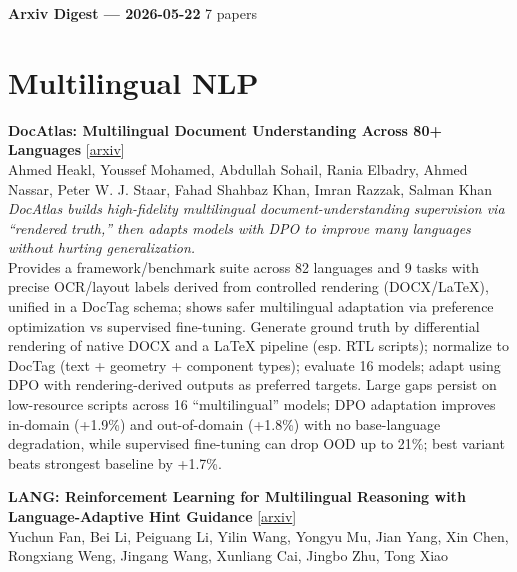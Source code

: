 \documentclass[12pt,letterpaper]{article}
\begin{document}
{\footnotesize\textbf{Arxiv Digest --- 2026-05-22} \hfill 7 papers}

\smallskip

\section*{Multilingual NLP}

{\small\textbf{DocAtlas: Multilingual Document Understanding Across 80+ Languages}} {\scriptsize[\href{https://arxiv.org/abs/2605.12623}{arxiv}]}\\
{\scriptsize Ahmed Heakl, Youssef Mohamed, Abdullah Sohail, Rania Elbadry, Ahmed Nassar, Peter W. J. Staar, Fahad Shahbaz Khan, Imran Razzak, Salman Khan}\\

{\small\textit{DocAtlas builds high-fidelity multilingual document-understanding supervision via ``rendered truth,'' then adapts models with DPO to improve many languages without hurting generalization.}}\\[1pt]
{\footnotesize Provides a framework/benchmark suite across 82 languages and 9 tasks with precise OCR/layout labels derived from controlled rendering (DOCX/LaTeX), unified in a DocTag schema; shows safer multilingual adaptation via preference optimization vs supervised fine-tuning. Generate ground truth by differential rendering of native DOCX and a LaTeX pipeline (esp. RTL scripts); normalize to DocTag (text + geometry + component types); evaluate 16 models; adapt using DPO with rendering-derived outputs as preferred targets. Large gaps persist on low-resource scripts across 16 ``multilingual'' models; DPO adaptation improves in-domain (+1.9\%) and out-of-domain (+1.8\%) with no base-language degradation, while supervised fine-tuning can drop OOD up to 21\%; best variant beats strongest baseline by +1.7\%.}

\medskip

{\small\textbf{LANG: Reinforcement Learning for Multilingual Reasoning with Language-Adaptive Hint Guidance}} {\scriptsize[\href{https://arxiv.org/abs/2605.22567}{arxiv}]}\\
{\scriptsize Yuchun Fan, Bei Li, Peiguang Li, Yilin Wang, Yongyu Mu, Jian Yang, Xin Chen, Rongxiang Weng, Jingang Wang, Xunliang Cai, Jingbo Zhu, Tong Xiao}\\
\end{document}
